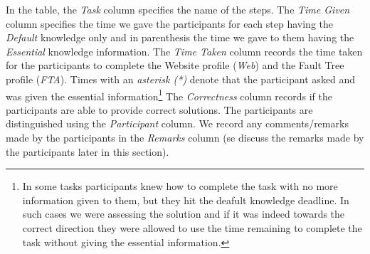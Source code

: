 In the table, the \textit{Task} column specifies the name of the steps. 
The \textit{Time Given} column specifies the time we gave the participants for each step having the \textit{Default} knowledge only and in parenthesis the time we gave to them having the \textit{Essential} knowledge information.
The \textit{Time Taken} column records the time taken for the participants to complete the Website profile (\textit{Web}) and the Fault Tree profile (\textit{FTA}). Times with an \textit{asterisk (*)} denote that the participant asked and was given the essential information\footnote{In some tasks participants knew how to complete the task with no more information given to them, but they hit the deafult knowledge deadline. In such cases we were assessing the solution and if it was indeed towards the correct direction they were allowed to use the time remaining to complete the task without giving the essential information.}
The \textit{Correctness} column records if the participants are able to provide correct solutions. 
The participants are distinguished using the \textit{Participant} column.
We record any comments/remarks made by the participants in the \textit{Remarks} column (se discuss the remarks made by the participants later in this section).


